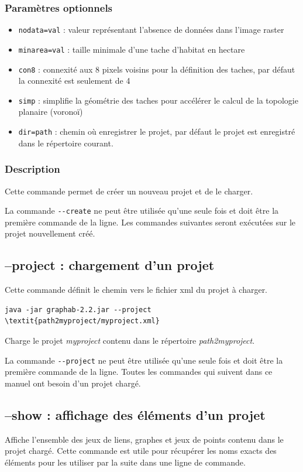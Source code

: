 \documentclass[a4paper,10pt]{report}
\begin{document}
\subsubsection{Paramètres optionnels}
\begin{itemize}
	\item \verb|nodata=val| : valeur représentant l'absence de données dans l'image raster
	\item \verb|minarea=val| : taille minimale d'une tache d'habitat en hectare
	\item \verb|con8| : connexité aux 8 pixels voisins pour la définition des taches, par défaut la connexité est seulement de 4
	\item \verb|simp| : simplifie la géométrie des taches pour accélérer le calcul de la topologie planaire (voronoï)
	\item \verb|dir=path| : chemin où enregistrer le projet, par défaut le projet est enregistré dans le répertoire courant.
\end{itemize}

\subsubsection{Description}
Cette commande permet de créer un nouveau projet et de le charger.

La commande \verb|--create| ne peut être utilisée qu'une seule fois et doit être la première commande de la ligne.
Les commandes suivantes seront exécutées sur le projet nouvellement créé.

\subsection{--project : chargement d'un projet}
Cette commande définit le chemin vers le fichier xml du projet à charger.
\begin{Verbatim}[commandchars=\\\{\}]
	java -jar graphab-2.2.jar --project \textit{path2myproject/myproject.xml}
\end{Verbatim}
Charge le projet \textit{myproject} contenu dans le répertoire \textit{path2myproject}.

La commande \verb|--project| ne peut être utilisée qu'une seule fois et doit être la première commande de la ligne.
Toutes les commandes qui suivent dans ce manuel ont besoin d'un projet chargé.

\subsection{--show : affichage des éléments d'un projet}
Affiche l'ensemble des jeux de liens, graphes et jeux de points contenu dans le projet chargé.
Cette commande est utile pour récupérer les noms exacts des éléments pour les utiliser par la suite dans une ligne de commande.
\end{document}
